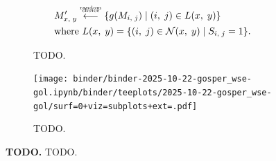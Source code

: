 \begin{figure}
\begin{minipage}[c]{1.0\linewidth}
\begin{subfigure}[]{0.35\linewidth}
    \begin{align*}
    &M_{\fontsize{2}{12} \selectfont x,\; y}'
    \stackrel{\substack{\text{\tiny random} \\[-0.7ex] \text{\tiny choice} \\[0.5ex] }}{\longleftarrow}
    \{g(M_{\fontsize{2}{12} \selectfont i,\; j}) \mid (i,\; j) \in L(x,\; y)\}\\
    &\text{where } L(x,\; y) =  \{(i,\; j) \in \mathcal{N}(x,\; y) \mid S_{\fontsize{2}{12} \selectfont i,\; j}=1\}.
\end{align*}
    \caption{\footnotesize
    TODO.
    }
    \label{fig:use-case-gol:schematic}
\end{subfigure}%
\begin{subfigure}[]{0.65\linewidth}
    \centering
    \texttt{[image: binder/binder-2025-10-22-gosper\_wse-gol.ipynb/binder/teeplots/2025-10-22-gosper\_wse-gol/surf=0+viz=subplots+ext=.pdf]}
    \caption{\footnotesize
    TODO.
    }
    \label{fig:use-case-gol:phylo}
\end{subfigure}
\end{minipage}%

\caption{%
\textbf{TODO.}
\footnotesize
TODO.
}
\label{fig:use-case-gol}
\end{figure}
